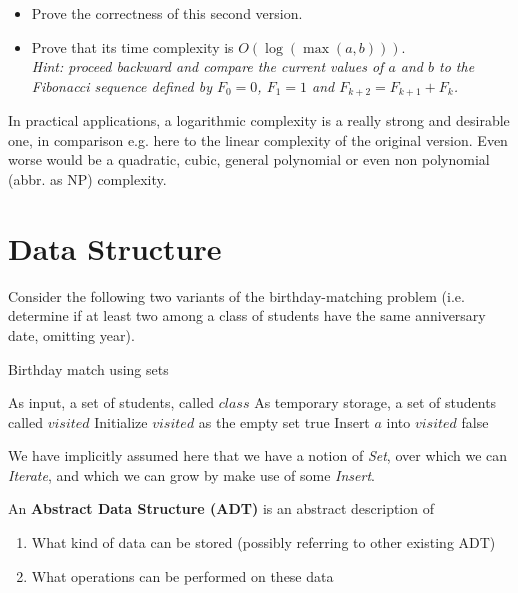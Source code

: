 \documentclass[12pt]{article}
\theoremstyle{plain}
\theoremstyle{remark}
\begin{document}
\begin{itemize}
\item Prove the correctness of this second version.
\item Prove that its time complexity is $O(\log(\max(a, b)))$.\\{\it Hint:
	proceed backward and compare the current values of $a$ and $b$ to the
		Fibonacci sequence defined by $F_0=0$, $F_1=1$ and $F_{k+2} =
		F_{k+1} + F_{k}$.}
\end{itemize}

In practical applications, a logarithmic complexity is a really strong 
and desirable one, in comparison e.g. here to the linear complexity of 
the original version. Even worse would be a quadratic, cubic, general polynomial
or even non polynomial (abbr. as NP) complexity.

\section{Data Structure}

Consider the following two variants of the birthday-matching problem (i.e.
determine if at least two among a class of students have the same anniversary
date, omitting year).

\begin{algorithm}[H]
\caption{Birthday match using sets}
\begin{algorithmic}
\Require As input, a set of students, called $class$
\Require As temporary storage, a set of students called $visited$
\State Initialize $visited$ as the empty set
\State \Return true
\EndIf
\EndFor
\State Insert $a$ into $visited$
\EndFor
\State \Return false
\end{algorithmic}
\end{algorithm}

We have implicitly assumed here that we have a notion of {\it Set}, over which we can
{\it Iterate}, and which we can grow by make use of some {\it Insert}.

An {\bf Abstract Data Structure (ADT)} is an abstract description of 
\begin{enumerate}
\item What kind of data can be stored (possibly referring to other existing ADT)
\item What operations can be performed on these data
\end{enumerate}
\end{document}
